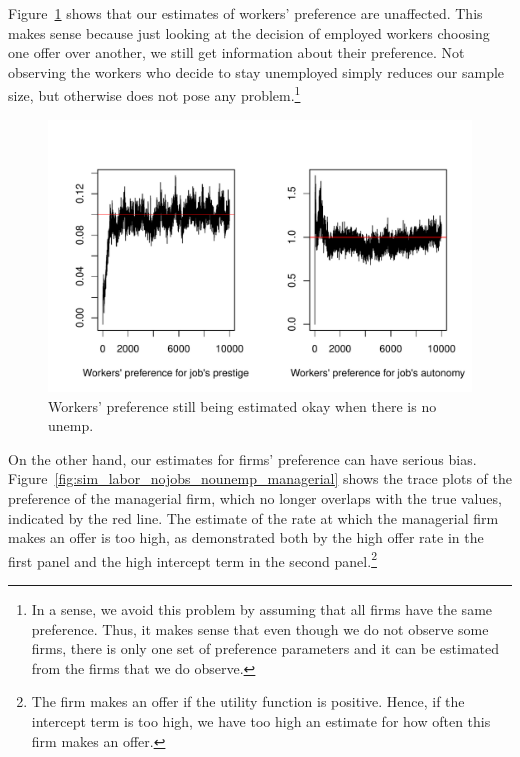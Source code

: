 Figure~\ref{fig:sim_labor_nojobs_nounemp_alpha} shows that our estimates of
workers' preference are unaffected. This makes sense because just looking at the
decision of employed workers choosing one offer over another, we
still get information about their preference. Not observing the workers who
decide to stay unemployed simply reduces our sample size, but otherwise does not
pose any problem.\footnote{In a sense, we avoid this problem by assuming that
  all firms have the same preference. Thus, it makes sense that even though we
  do not observe some firms, there is only one set of preference parameters and
  it can be estimated from the firms that we do observe.}

\begin{figure}[!ht]
  \centering
  \includegraphics[width=\textwidth,keepaspectratio]{../figure/sim_labor_nojobs_nounemp_alpha}
  \caption{Workers' preference still being estimated okay when there is no unemp.}
  \label{fig:sim_labor_nojobs_nounemp_alpha}
\end{figure}

On the other hand, our estimates for firms' preference can have serious bias.
Figure~\ref{fig:sim_labor_nojobs_nounemp_managerial} shows the trace plots of
the preference of the managerial firm, which no longer overlaps with the true
values, indicated by the red line. The estimate of the rate at which the
managerial firm makes an offer is too high, as demonstrated both by the high
offer rate in the first panel and the high intercept term in the second
panel.\footnote{The firm makes an offer if the utility function is positive.
  Hence, if the intercept term is too high, we have too high an estimate for how
often this firm makes an offer.}  

